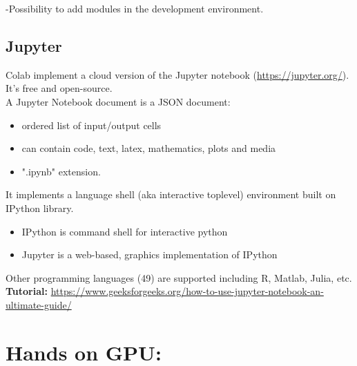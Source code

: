 -Possibility to add modules in the
development environment.

\subsection{Jupyter}

Colab implement a cloud version of the Jupyter notebook (\url{https://jupyter.org/}). It’s free and open-source.\\
A Jupyter Notebook document is a JSON document:
\begin{itemize}
	\item ordered list of input/output cells
	\item can contain code, text, latex, mathematics, plots and media
	\item ".ipynb" extension.
\end{itemize}

It implements a language shell (aka interactive toplevel) environment built on IPython library.\\

\begin{itemize}
	\item IPython is command shell for interactive python
	\item Jupyter is a web-based, graphics implementation of IPython
\end{itemize}

Other programming languages (49) are supported including R, Matlab, Julia, etc.\\
\textbf{Tutorial:} \url{https://www.geeksforgeeks.org/how-to-use-jupyter-notebook-an-ultimate-guide/}

\section{Hands on GPU:}



